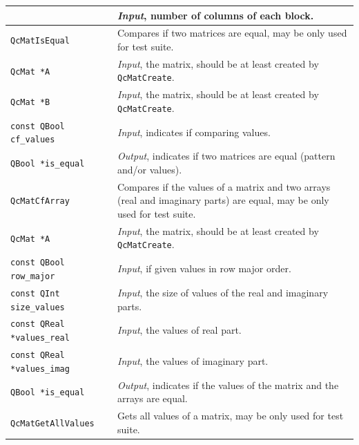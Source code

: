 \documentclass[a4paper,11pt,twoside,openright]{book}
\begin{document}
\begin{center}
\begin{longtable}{l|p{}}
      & \textsl{Input}, number of columns of each block.\\
    \hline
    \verb|QcMatIsEqual|\index{\texttt{QcMatIsEqual}} %
      & Compares if two matrices are equal, may be only used for test suite.\\
    \hspace*{2ex}\verb|QcMat *A| %
      & \textsl{Input}, the matrix, should be at least created by \verb|QcMatCreate|.\\
    \hspace*{2ex}\verb|QcMat *B| %
      & \textsl{Input}, the matrix, should be at least created by \verb|QcMatCreate|.\\
    \hspace*{2ex}\verb|const QBool cf_values| %
      & \textsl{Input}, indicates if comparing values.\\
    \hspace*{2ex}\verb|QBool *is_equal| %
      & \textsl{Output}, indicates if two matrices are equal (pattern and/or values).\\
    \hline
    \verb|QcMatCfArray|\index{\texttt{QcMatCfArray}} %
      & Compares if the values of a matrix and two arrays (real and imaginary parts)
        are equal, may be only used for test suite.\\
    \hspace*{2ex}\verb|QcMat *A| %
      & \textsl{Input}, the matrix, should be at least created by \verb|QcMatCreate|.\\
    \hspace*{2ex}\verb|const QBool row_major| %
      & \textsl{Input}, if given values in row major order.\\
    \hspace*{2ex}\verb|const QInt size_values| %
      & \textsl{Input}, the size of values of the real and imaginary parts.\\
    \hspace*{2ex}\verb|const QReal *values_real| %
      & \textsl{Input}, the values of real part.\\
    \hspace*{2ex}\verb|const QReal *values_imag| %
      & \textsl{Input}, the values of imaginary part.\\
    \hspace*{2ex}\verb|QBool *is_equal| %
      & \textsl{Output}, indicates if the values of the matrix and the arrays are equal.\\
    \hline
    \verb|QcMatGetAllValues|\index{\texttt{QcMatGetAllValues}} %
      & Gets all values of a matrix, may be only used for test suite.\\

\end{longtable}
\end{center}
\end{document}
